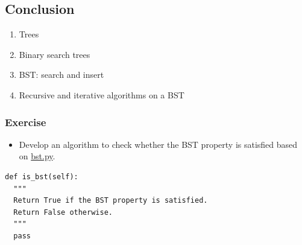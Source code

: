 \documentclass[aspectratio=169, 14pt]{beamer}
\begin{document}
\begin{frame}

	\section{\textcolor{darkmidnightblue}{Conclusion}}

	\begin{enumerate}
		\item Trees
		\item Binary search trees
		\item BST: search and insert
		\item Recursive and iterative algorithms on a BST
	\end{enumerate}
\end{frame}

\begin{frame}[fragile]
	\frametitle{Exercise}
	\begin{itemize}
		\item Develop an algorithm to check whether the \alert{BST property} is satisfied based on \href{https://github.com/ChenZhongPu/data-structure-swufe/blob/master/code/python/tree/bst.py}{bst.py}.
	\end{itemize}

	\begin{verbatim}
def is_bst(self):
  """
  Return True if the BST property is satisfied.
  Return False otherwise.
  """
  pass
\end{verbatim}

\end{frame}
\end{document}
